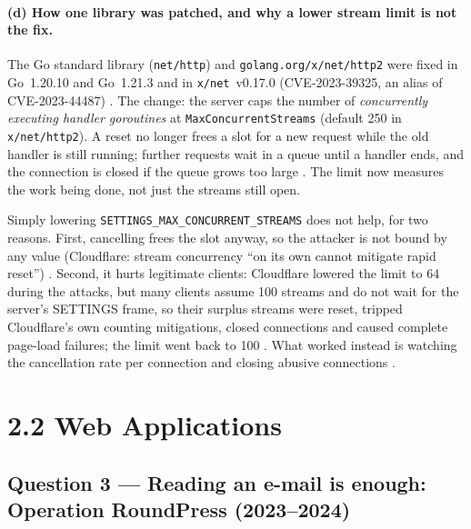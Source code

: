 \documentclass[11pt,a4paper]{article}
\newcommand{\code}[1]{\texttt{#1}}
\begin{document}
\paragraph{(d) How one library was patched, and why a lower stream limit is not the fix.} The Go standard library
(\code{net/http}) and \code{golang.org/x/net/http2} were fixed in Go~1.20.10 and Go~1.21.3 and in
\code{x/net}~v0.17.0 (CVE-2023-39325, an alias of CVE-2023-44487) \cite{godb}. The change: the server caps the number of
\emph{concurrently executing handler goroutines} at \code{MaxConcurrentStreams} (default 250 in \code{x/net/http2}). A reset
no longer frees a slot for a new request while the old handler is still running; further requests wait in a queue
until a handler ends, and the connection is closed if the queue grows too large \cite{godb}. The limit now measures the
work being done, not just the streams still open.

Simply lowering \code{SETTINGS\_MAX\_CONCURRENT\_STREAMS} does not help, for two reasons. First, cancelling frees the slot
anyway, so the attacker is not bound by any value (Cloudflare: stream concurrency ``on its own cannot mitigate rapid
reset'') \cite{cftech}. Second, it hurts legitimate clients: Cloudflare lowered the limit to 64 during the attacks, but
many clients assume 100 streams and do not wait for the server's SETTINGS frame, so their surplus streams were reset,
tripped Cloudflare's own counting mitigations, closed connections and caused complete page-load failures; the limit
went back to 100 \cite{cftech}. What worked instead is watching the cancellation rate per connection and closing
abusive connections \cite{googlehow}.

\section*{2.2 Web Applications}

\subsection*{Question 3 --- Reading an e-mail is enough: Operation RoundPress (2023--2024)}
\end{document}
